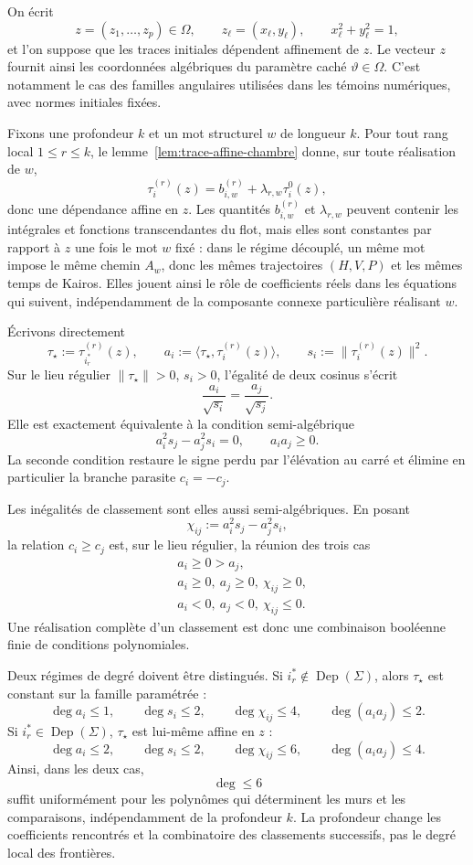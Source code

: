 \documentclass[11pt,a4paper]{article}
\theoremstyle{definition}
\theoremstyle{remark}
\begin{document}
On écrit
\[
 z=(z_1,\dots,z_p)\in\Omega,
 \qquad
 z_\ell=(x_\ell,y_\ell),
 \qquad
 x_\ell^2+y_\ell^2=1,
\]
et l'on suppose que les traces initiales dépendent affinement de $z$. Le vecteur $z$ fournit ainsi les coordonnées algébriques du paramètre caché $\vartheta\in\Omega$. C'est notamment le cas des familles angulaires utilisées dans les témoins numériques, avec normes initiales fixées.

Fixons une profondeur $k$ et un mot structurel $w$ de longueur $k$. Pour tout rang local $1\le r\le k$, le lemme~\ref{lem:trace-affine-chambre} donne, sur toute réalisation de $w$,
\[
 \tau_i^{(r)}(z)=b_{i,w}^{(r)}+\lambda_{r,w}\tau_i^0(z),
\]
donc une dépendance affine en $z$. Les quantités $b_{i,w}^{(r)}$ et $\lambda_{r,w}$ peuvent contenir les intégrales et fonctions transcendantes du flot, mais elles sont constantes par rapport à $z$ une fois le mot $w$ fixé : dans le régime découplé, un même mot impose le même chemin $A_w$, donc les mêmes trajectoires $(H,V,P)$ et les mêmes temps de Kairos. Elles jouent ainsi le rôle de coefficients réels dans les équations qui suivent, indépendamment de la composante connexe particulière réalisant $w$.

Écrivons directement
\[
 \tau_\star:=\tau_{i_r^*}^{(r)}(z),
 \qquad
 a_i:=\langle \tau_\star,\tau_i^{(r)}(z)\rangle,
 \qquad
 s_i:=\|\tau_i^{(r)}(z)\|^2.
\]
Sur le lieu régulier $\|\tau_\star\|>0$, $s_i>0$, l'égalité de deux cosinus s'écrit
\[
 \frac{a_i}{\sqrt{s_i}}
 =\frac{a_j}{\sqrt{s_j}}.
\]
Elle est exactement équivalente à la condition semi-algébrique
\[
 \boxed{
 a_i^2s_j-a_j^2s_i=0,
 \qquad
 a_ia_j\ge0.}
\]
La seconde condition restaure le signe perdu par l'élévation au carré et élimine en particulier la branche parasite $c_i=-c_j$.

Les inégalités de classement sont elles aussi semi-algébriques. En posant
\[
 \chi_{ij}:=a_i^2s_j-a_j^2s_i,
\]
la relation $c_i\ge c_j$ est, sur le lieu régulier, la réunion des trois cas
\[
 \begin{aligned}
 &a_i\ge0>a_j,\\
 &a_i\ge0,\ a_j\ge0,\ \chi_{ij}\ge0,\\
 &a_i<0,\ a_j<0,\ \chi_{ij}\le0.
 \end{aligned}
\]
Une réalisation complète d'un classement est donc une combinaison booléenne finie de conditions polynomiales.

Deux régimes de degré doivent être distingués. Si $i_r^*\notin\operatorname{Dep}(\Sigma)$, alors $\tau_\star$ est constant sur la famille paramétrée :
\[
 \deg a_i\le1,
 \qquad
 \deg s_i\le2,
 \qquad
 \deg \chi_{ij}\le4,
 \qquad
 \deg(a_ia_j)\le2.
\]
Si $i_r^*\in\operatorname{Dep}(\Sigma)$, $\tau_\star$ est lui-même affine en $z$ :
\[
 \deg a_i\le2,
 \qquad
 \deg s_i\le2,
 \qquad
 \deg \chi_{ij}\le6,
 \qquad
 \deg(a_ia_j)\le4.
\]
Ainsi, dans les deux cas,
\[
 \boxed{\deg\le6}
\]
suffit uniformément pour les polynômes qui déterminent les murs et les comparaisons, indépendamment de la profondeur $k$. La profondeur change les coefficients rencontrés et la combinatoire des classements successifs, pas le degré local des frontières.
\end{document}
